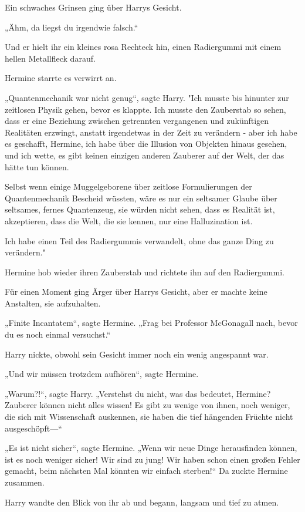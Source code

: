 {Ein schwaches Grinsen ging über Harrys Gesicht.

„Ähm, da liegst du irgendwie falsch.“

Und er hielt ihr ein kleines rosa Rechteck hin, einen Radiergummi mit einem hellen Metallfleck darauf.

Hermine starrte es verwirrt an.

„Quantenmechanik war nicht genug“, sagte Harry. "Ich musste bis hinunter zur zeitlosen Physik gehen, bevor es klappte. Ich musste den Zauberstab so sehen, dass er eine Beziehung zwischen getrennten vergangenen und zukünftigen Realitäten erzwingt, anstatt irgendetwas in der Zeit zu verändern - aber ich habe es geschafft, Hermine, ich habe über die Illusion von Objekten hinaus gesehen, und ich wette, es gibt keinen einzigen anderen Zauberer auf der Welt, der das hätte tun können.

Selbst wenn einige Muggelgeborene über zeitlose Formulierungen der Quantenmechanik Bescheid wüssten, wäre es nur ein seltsamer Glaube über seltsames, fernes Quantenzeug, sie würden nicht sehen, dass es Realität ist, akzeptieren, dass die Welt, die sie kennen, nur eine Halluzination ist.

Ich habe einen Teil des Radiergummis verwandelt, ohne das ganze Ding zu verändern."

Hermine hob wieder ihren Zauberstab und richtete ihn auf den Radiergummi.

Für einen Moment ging Ärger über Harrys Gesicht, aber er machte keine Anstalten, sie aufzuhalten.

„Finite Incantatem“, sagte Hermine. „Frag bei Professor McGonagall nach, bevor du es noch einmal versuchst.“

Harry nickte, obwohl sein Gesicht immer noch ein wenig angespannt war.

„Und wir müssen trotzdem aufhören“, sagte Hermine.

„Warum?!“, sagte Harry. „Verstehst du nicht, was das bedeutet, Hermine? Zauberer können nicht alles wissen! Es gibt zu wenige von ihnen, noch weniger, die sich mit Wissenschaft auskennen, sie haben die tief hängenden Früchte nicht ausgeschöpft—“

„Es ist nicht sicher“, sagte Hermine. „Wenn wir neue Dinge herausfinden können, ist es noch weniger sicher! Wir sind zu jung! Wir haben schon einen großen Fehler gemacht, beim nächsten Mal könnten wir einfach sterben!“ Da zuckte Hermine zusammen.

Harry wandte den Blick von ihr ab und begann, langsam und tief zu atmen.

}
